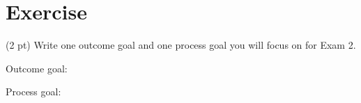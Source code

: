 %
%
%
%

\section{Exercise}

(2 pt) Write one outcome goal and one process goal you will focus on for Exam 2.

\vspace{0.25in}

\noindent{}Outcome goal:

\vspace{1in}

\noindent{}Process goal:

\vspace{1in}